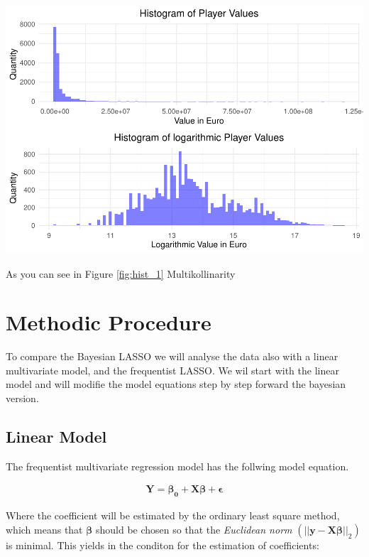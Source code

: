 \documentclass[12pt,a4paper]{article}
\let\origfigure\figure
\let\endorigfigure\endfigure
\renewenvironment{figure}[1][2] {
    \expandafter\origfigure\expandafter[H]
} {
    \endorigfigure
}
\begin{document}
\begin{figure}
\centering
\includegraphics{term_paper_bayes_files/figure-latex/fig1-1.pdf}
\caption{\label{fig:hist_1} Histograms of player values and log player
values}
\end{figure}

As you can see in Figure \ref{fig:hist_1} Multikollinarity

\newpage

\hypertarget{methodic-procedure}{%
\section{Methodic Procedure}\label{methodic-procedure}}

To compare the Bayesian \ac{LASSO} we will analyse the data also with a
linear multivariate model, and the frequentist \ac{LASSO}. We wil start
with the linear model and will modifie the model equations step by step
forward the bayesian version.

\hypertarget{linear-model}{%
\subsection{Linear Model}\label{linear-model}}

The frequentist multivariate regression model has the follwing model
equation.

\begin{align}
\label{eq:lm}
\pmb{Y = \beta_0 + X \beta} + \pmb{\epsilon}
\end{align}

Where the coefficient will be estimated by the ordinary least square
method, which means that \(\pmb{\beta}\) should be chosen so that the
\emph{Euclidean norm} \(\left( || \mathbf{y - X\beta} ||_2 \right)\) is
minimal. This yields in the conditon for the estimation of coefficients:
\end{document}
